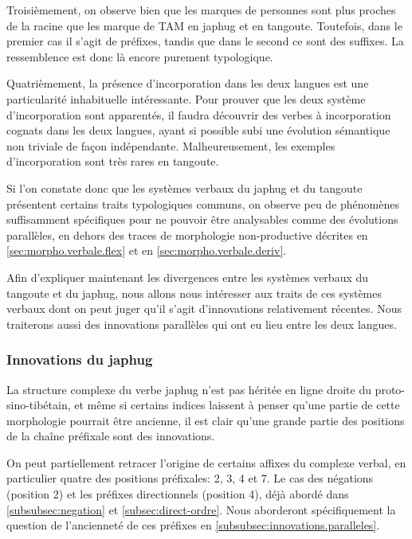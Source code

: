\documentclass[oldfontcommands,twoside,a4paper,11pt,draft]{memoir}
\begin{document}
Troisièmement, on observe bien que les marques de personnes sont plus proches de la racine que les marque de TAM en japhug et en tangoute. Toutefois, dans le premier cas il s'agit de préfixes, tandis que dans le second ce sont des suffixes. La ressemblence est donc là encore purement typologique.

Quatrièmement, la présence d'incorporation dans les deux langues est une particularité inhabituelle intéressante. Pour prouver que les deux système d'incorporation sont apparentés, il faudra découvrir des verbes à incorporation cognats dans les deux langues, ayant si possible subi une évolution sémantique non triviale de façon indépendante. Malheureusement, les exemples d'incorporation sont très rares en tangoute. 

Si l'on constate donc que les systèmes verbaux du japhug et du tangoute présentent certains traits typologiques communs, on observe peu de phénomènes  suffisamment spécifiques pour ne pouvoir être analysables comme  des évolutions parallèles, en dehors des traces de morphologie non-productive décrites en \ref{sec:morpho.verbale.flex} et en \ref{sec:morpho.verbale.deriv}.

Afin d'expliquer maintenant les divergences entre les systèmes verbaux du tangoute et du japhug, nous allons nous intéresser aux traits de ces systèmes verbaux dont on peut juger qu'il s'agit d'innovations relativement récentes. Nous traiterons aussi des innovations parallèles qui ont eu lieu entre les deux langues.

\subsubsection{Innovations du japhug} \label{subsubsec:innovations.japhug}

La structure complexe du verbe japhug n'est pas héritée en ligne droite du proto-sino-tibétain, et même si certains indices laissent à penser qu'une partie de cette morphologie pourrait être ancienne, il est clair qu'une grande partie  des positions de la chaîne préfixale sont des innovations.  

On peut partiellement retracer l'origine de certains affixes du complexe verbal, en particulier quatre des positions préfixales: 2, 3, 4 et 7. Le cas des négations (position 2) et les préfixes directionnels (position 4), déjà abordé dans \ref{subsubsec:negation} et \ref{subsec:direct-ordre}. Nous aborderont spécifiquement la question de l'ancienneté de ces préfixes en \ref{subsubsec:innovations.paralleles}.
\end{document}
